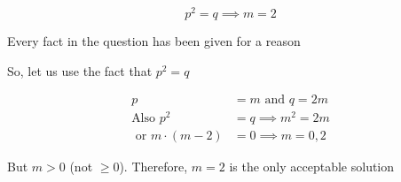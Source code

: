 \documentclass[14pt,fleqn]{extarticle}
\begin{document}
\begin{question}
\begin{step}
  \begin{options} 
     \correct 
       
       \[ p^2 = q \implies m = 2 \]
        
    \end{options} 
     \reason 
       
     Every fact in the question has been given for a reason\newline 
     
     So, let us use the fact that $p^2 = q$ 
     
     \begin{align}
	p &= m \text{ and } q = 2m \\
	\text{Also }p^2 &= q \implies m^2 = 2m \\
	\text{ or } m\cdot(m-2) &= 0\implies m = 0,2 
\end{align}

But $m > 0$ (not $\geq 0$). Therefore, $m=2$ is the only acceptable solution 
\end{step}
\end{question} 
\end{document}
